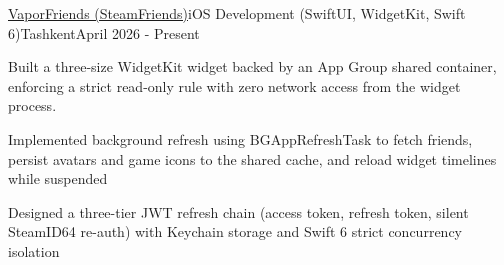 \begin{resume_employer}{\href{https://apps.apple.com/us/app/vaporfriends/id6762462173}{VaporFriends (SteamFriends)}}{iOS Development (SwiftUI, WidgetKit, Swift 6)}{Tashkent}{April 2026 - Present}

\item Built a three-size WidgetKit widget backed by an App Group shared container, enforcing a strict read-only rule with zero network access from the widget process.
\item Implemented background refresh using BGAppRefreshTask to fetch friends, persist avatars and game icons to the shared cache, and reload widget timelines while suspended        
\item Designed a three-tier JWT refresh chain (access token, refresh token, silent SteamID64 re-auth) with Keychain storage and Swift 6 strict concurrency isolation
  
\end{resume_employer} 
